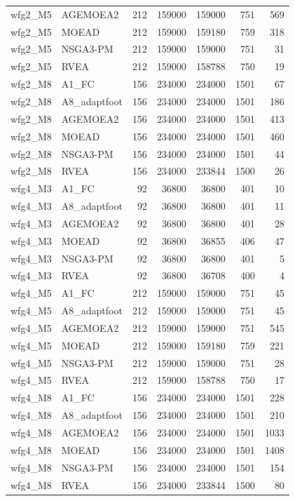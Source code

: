 \begin{tabular}{llrrrrr}
wfg2_M5 & AGEMOEA2 & 212 & 159000 & 159000 & 751 & 569 \\
wfg2_M5 & MOEAD & 212 & 159000 & 159180 & 759 & 318 \\
wfg2_M5 & NSGA3-PM & 212 & 159000 & 159000 & 751 & 31 \\
wfg2_M5 & RVEA & 212 & 159000 & 158788 & 750 & 19 \\
wfg2_M8 & A1_FC & 156 & 234000 & 234000 & 1501 & 67 \\
wfg2_M8 & A8_adaptfoot & 156 & 234000 & 234000 & 1501 & 186 \\
wfg2_M8 & AGEMOEA2 & 156 & 234000 & 234000 & 1501 & 413 \\
wfg2_M8 & MOEAD & 156 & 234000 & 234000 & 1501 & 460 \\
wfg2_M8 & NSGA3-PM & 156 & 234000 & 234000 & 1501 & 44 \\
wfg2_M8 & RVEA & 156 & 234000 & 233844 & 1500 & 26 \\
wfg4_M3 & A1_FC & 92 & 36800 & 36800 & 401 & 10 \\
wfg4_M3 & A8_adaptfoot & 92 & 36800 & 36800 & 401 & 11 \\
wfg4_M3 & AGEMOEA2 & 92 & 36800 & 36800 & 401 & 28 \\
wfg4_M3 & MOEAD & 92 & 36800 & 36855 & 406 & 47 \\
wfg4_M3 & NSGA3-PM & 92 & 36800 & 36800 & 401 & 5 \\
wfg4_M3 & RVEA & 92 & 36800 & 36708 & 400 & 4 \\
wfg4_M5 & A1_FC & 212 & 159000 & 159000 & 751 & 45 \\
wfg4_M5 & A8_adaptfoot & 212 & 159000 & 159000 & 751 & 45 \\
wfg4_M5 & AGEMOEA2 & 212 & 159000 & 159000 & 751 & 545 \\
wfg4_M5 & MOEAD & 212 & 159000 & 159180 & 759 & 221 \\
wfg4_M5 & NSGA3-PM & 212 & 159000 & 159000 & 751 & 28 \\
wfg4_M5 & RVEA & 212 & 159000 & 158788 & 750 & 17 \\
wfg4_M8 & A1_FC & 156 & 234000 & 234000 & 1501 & 228 \\
wfg4_M8 & A8_adaptfoot & 156 & 234000 & 234000 & 1501 & 210 \\
wfg4_M8 & AGEMOEA2 & 156 & 234000 & 234000 & 1501 & 1033 \\
wfg4_M8 & MOEAD & 156 & 234000 & 234000 & 1501 & 1408 \\
wfg4_M8 & NSGA3-PM & 156 & 234000 & 234000 & 1501 & 154 \\
wfg4_M8 & RVEA & 156 & 234000 & 233844 & 1500 & 80 \\

\end{tabular}
